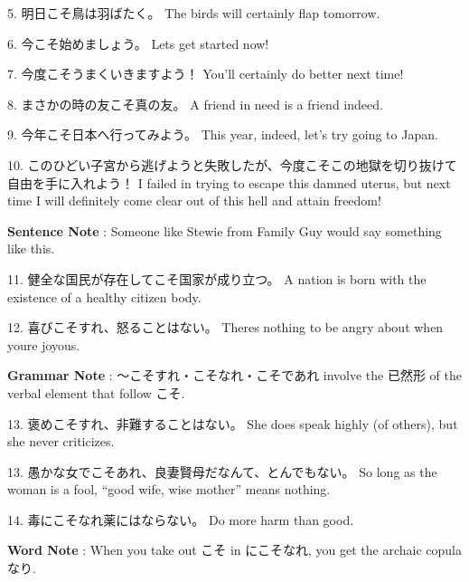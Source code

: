 \par{5. 明日こそ鳥は羽ばたく。 \hfill\break
The birds will certainly flap tomorrow. }

\par{6. 今こそ始めましょう。 \hfill\break
Let\textquotesingle s get started now! }

\par{7. 今度こそうまくいきますよう！ \hfill\break
You'll certainly do better next time! }

\par{8. まさかの時の友こそ真の友。 \hfill\break
A friend in need is a friend indeed. }

\par{9. 今年こそ日本へ行ってみよう。 \hfill\break
This year, indeed, let's try going to Japan. }

\par{10. このひどい子宮から逃げようと失敗したが、今度こそこの地獄を切り抜けて自由を手に入れよう！ \hfill\break
I failed in trying to escape this damned uterus, but next time I will definitely come clear out of this hell and attain freedom! }

\par{\textbf{Sentence Note }: Someone like Stewie from Family Guy would say something like this. }

\par{11. 健全な国民が存在してこそ国家が成り立つ。 \hfill\break
A nation is born with the existence of a healthy citizen body. }

\par{12. 喜びこそすれ、怒ることはない。 \hfill\break
There\textquotesingle s nothing to be angry about when you\textquotesingle re joyous. }

\par{\textbf{Grammar Note }: ～こそすれ・こそなれ・こそであれ involve the 已然形 of the verbal element that follow こそ. }

\par{13. 褒めこそすれ、非難することはない。 \hfill\break
She does speak highly (of others), but she never criticizes. }

\par{13. 愚かな女でこそあれ、良妻賢母だなんて、とんでもない。 \hfill\break
So long as the woman is a fool, “good wife, wise mother” means nothing. }

\par{14. 毒にこそなれ薬にはならない。 \hfill\break
Do more harm than good. }

\par{ \textbf{Word Note }: When you take out こそ in にこそなれ, you get the archaic copula なり. }

